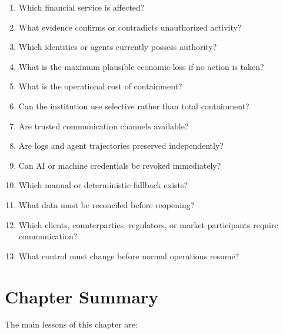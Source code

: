 \begin{enumerate}
    \item Which financial service is affected?
    \item What evidence confirms or contradicts unauthorized activity?
    \item Which identities or agents currently possess authority?
    \item What is the maximum plausible economic loss if no action is taken?
    \item What is the operational cost of containment?
    \item Can the institution use selective rather than total containment?
    \item Are trusted communication channels available?
    \item Are logs and agent trajectories preserved independently?
    \item Can AI or machine credentials be revoked immediately?
    \item Which manual or deterministic fallback exists?
    \item What data must be reconciled before reopening?
    \item Which clients, counterparties, regulators, or market participants require communication?
    \item What control must change before normal operations resume?
\end{enumerate}

\section{Chapter Summary}

The main lessons of this chapter are:

